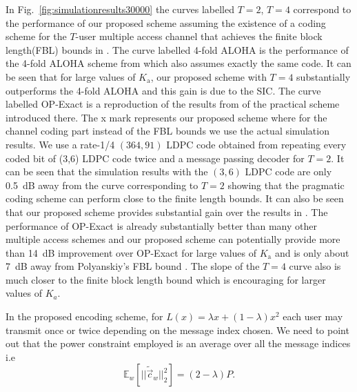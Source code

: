 \documentclass[final,onecolumn,12pt]{IEEEtran}
\def\Ka{K_{\text{a}}}
\begin{document}
In Fig.~\ref{fig:simulationresults30000} the curves labelled $T=2$, $T=4$ correspond to the performance of our proposed scheme assuming the existence of a coding scheme for the $T$-user multiple access channel that achieves the finite block length(FBL) bounds in \cite{polyanskiy17}. The curve labelled 4-fold ALOHA is the performance of the 4-fold ALOHA scheme from \cite{ordentlich17} which also assumes exactly the same code. It can be seen that for large values of $\Ka$, our proposed scheme with $T=4$ substantially outperforms the 4-fold ALOHA and this gain is due to the SIC. The curve labelled OP-Exact is a reproduction of the results from \cite{ordentlich17} of the practical scheme introduced there. The x mark represents our proposed scheme where for the channel coding part instead of the FBL bounds we use the actual simulation results. We use a rate-1/4 $(364,91)$ LDPC code obtained from repeating every coded bit of (3,6) LDPC code twice and a message passing decoder for $T=2$. It can be seen that the simulation results with the $(3,6)$ LDPC code are only 0.5~dB away from the curve corresponding to $T=2$ showing that the pragmatic coding scheme can perform close to the finite length bounds. It can also be seen that our proposed scheme provides substantial gain over the results in \cite{ordentlich17}. The performance of OP-Exact is already substantially better than many other multiple access schemes and our proposed scheme can potentially provide more than 14~dB improvement over OP-Exact for large values of $\Ka$ and is only about 7~dB away from Polyanskiy's FBL bound \cite{polyanskiy17}. The slope of the $T=4$ curve also is much closer to the finite block length bound which is encouraging for larger values of $K_a$. 


 In the proposed encoding scheme, for $L(x)=\lambda x+(1-\lambda)x^2$ each user may transmit once or twice depending on the message index chosen. We need to point out that the power constraint employed is an average over all the message indices i.e
\[
\mathbb{E}_{w}\left[||\tilde{\vec{c}}_w||_2^2\right]=(2-\lambda)P.
\]
\end{document}
